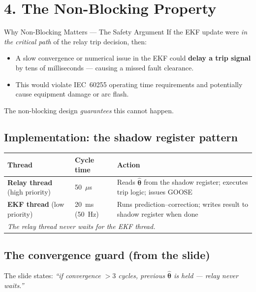 \documentclass[12pt,a4paper]{article}
\begin{document}
\section{4.\; The Non-Blocking Property}

\begin{warnbox}{Why Non-Blocking Matters — The Safety Argument}
If the EKF update were \emph{in the critical path} of the relay trip decision, then:
\begin{itemize}[nosep]
  \item A slow convergence or numerical issue in the EKF could \textbf{delay a
        trip signal} by tens of milliseconds — causing a missed fault clearance.
  \item This would violate IEC~60255 operating time requirements and potentially
        cause equipment damage or arc flash.
\end{itemize}
The non-blocking design \emph{guarantees} this cannot happen.
\end{warnbox}

\subsection{Implementation: the shadow register pattern}

\begin{center}
\begin{tabular}{@{}lp{5cm}p{5.5cm}@{}}
\toprule
\textbf{Thread} & \textbf{Cycle time} & \textbf{Action}\\
\midrule
\textbf{Relay thread} (high priority) & 50~$\mu$s & Reads $\hat{\boldsymbol{\theta}}$
  from the shadow register; executes trip logic; issues GOOSE\\
\textbf{EKF thread} (low priority) & 20~ms (50~Hz) & Runs prediction--correction;
  writes result to shadow register when done\\
\midrule
\multicolumn{3}{l}{\textit{The relay thread never waits for the EKF thread.}}\\
\bottomrule
\end{tabular}
\end{center}

\subsection{The convergence guard (from the slide)}

The slide states: \emph{``if convergence $>3$ cycles, previous $\hat{\boldsymbol{\theta}}$
is held — relay never waits.''}
\end{document}
